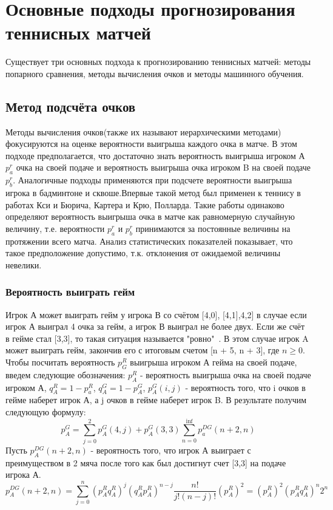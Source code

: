 \section{Основные подходы прогнозирования теннисных матчей}
Существует три основных подхода к прогнозированию теннисных матчей: методы попарного сравнения, методы вычисления очков и методы машинного обучения.
\subsection{Метод подсчёта очков}
Методы вычисления очков(также их называют иерархическими методами) фокусируются на оценке вероятности выигрыша каждого очка в матче. 
В этом подходе предполагается, что достаточно знать вероятность выигрыша игроком А $p_a^r$ очка на своей подаче и вероятность выигрыша очка игроком B на своей подаче $p_b^r$. Аналогичные подходы  применяются при подсчете вероятности выигрыша игрока в бадминтоне\cite{Book19} и сквоше\cite{Book20}.Впервые такой метод был применен к теннису в работах Кси и Бюрича\cite{Book21}, Картера и Крю\cite{Book22}, Полларда\cite{Book23}.
Такие работы одинаково определяют вероятность выигрыша очка в матче как равномерную случайную величину, т.е. вероятности  $p_a^r$ и  $p_b^r$ принимаются за постоянные величины на протяжении всего матча. Анализ статистических показателей показывает, что такое предположение допустимо\cite{Book09}, т.к. отклонения от ожидаемой величины невелики.
\subsubsection{Вероятность выиграть гейм}
Игрок А может выиграть гейм у игрока В со счётом [4,0], [4,1],4,2] в случае если игрок А выиграл 4 очка за гейм, а игрок В выиграл не более двух. Если же счёт в гейме стал [3,3], то такая ситуация называется "ровно"\ . В этом случае игрок A может выиграть гейм, закончив его с итоговым счетом [n + 5, n + 3], где $n\geq0$. Чтобы посчитать вероятность $p_G^R$ выигрыша игроком А гейма на своей подаче, введем следующие обозначения: $p_A^R$ - вероятность выигрыша очка на своей подаче игроком А, $q_A^R=1-p_a^R$, $q_A^G = 1 - p_A^G$, $p_A^G(i,j)$ - вероятность того, что i очков в гейме наберет игрок А, а j очков в гейме наберет игрок B. В результате получим следующую формулу:
\begin{equation}
p_A^G=\sum\limits^{2}_{j=0}{p_A^G(4,j)  + p_A^G(3,3)\sum\limits^{\inf}_{n=0}p_a^{DG}(n + 2, n)}
\end{equation}
Пусть $p_A^{DG}(n + 2, n)$ - вероятность того, что игрок А выиграет с преимуществом в 2 мяча после того как был достигнут счет [3,3] на подаче игрока А.
\begin{equation}
p_A^{DG}(n+2,n)=\sum\limits^{n}_{j=0}{(p_A^Rq_A^R)^j(q^R_Ap^R_A)^{n-j}\frac{n!}{j!(n-j)!}}(p^R_A)^2=(p^R_A)^2(p^R_Aq^R_A)^n2^n
\end{equation}

